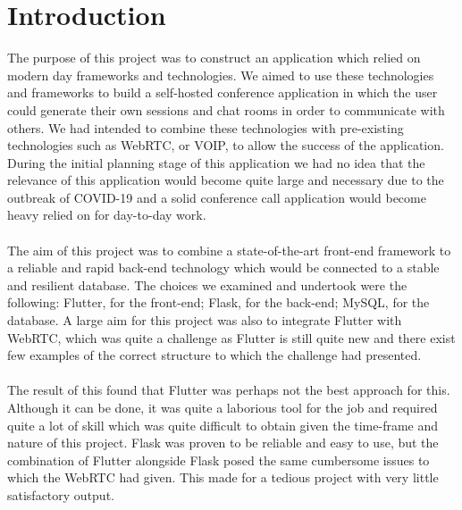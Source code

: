 \chapter{Introduction}
The purpose of this project was to construct an application which relied on modern day frameworks and technologies. We aimed to use these technologies and frameworks to build a self-hosted conference application in which the user could generate their own sessions and chat rooms in order to communicate with others. We had intended to combine these technologies with pre-existing technologies such as WebRTC, or VOIP, to allow the success of the application. During the initial planning stage of this application we had no idea that the relevance of this application would become quite large and necessary due to the outbreak of COVID-19 and a solid conference call application would become heavy relied on for day-to-day work.
\\\\ The aim of this project was to combine a state-of-the-art front-end framework to a reliable and rapid back-end technology which would be connected to a stable and resilient database. The choices we examined and undertook were the following: Flutter, for the front-end; Flask, for the back-end; MySQL, for the database. A large aim for this project was also to integrate Flutter with WebRTC, which was quite a challenge as Flutter is still quite new and there exist few examples of the correct structure to which the challenge had presented.
\\\\ The result of this found that Flutter was perhaps not the best approach for this. Although it can be done, it was quite a laborious tool for the job and required quite a lot of skill which was quite difficult to obtain given the time-frame and nature of this project. Flask was proven to be reliable and easy to use, but the combination of Flutter alongside Flask posed the same cumbersome issues to which the WebRTC had given. This made for a tedious project with very little satisfactory output. 

